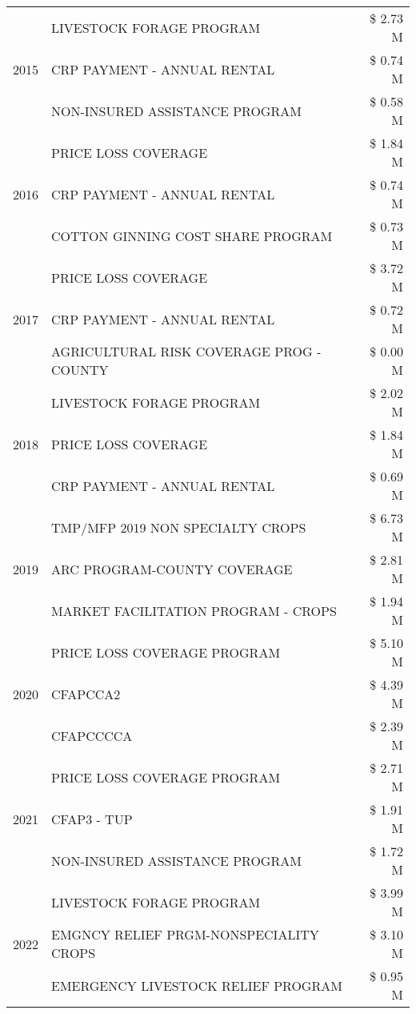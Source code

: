\begin{tabular}{llr}
\cline{1-3}
\multirow[t]{3}{*}{2015} & LIVESTOCK FORAGE PROGRAM & \$ 2.73 M \\
 & CRP PAYMENT - ANNUAL RENTAL & \$ 0.74 M \\
 & NON-INSURED ASSISTANCE PROGRAM & \$ 0.58 M \\
\cline{1-3}
\multirow[t]{3}{*}{2016} & PRICE LOSS COVERAGE & \$ 1.84 M \\
 & CRP PAYMENT - ANNUAL RENTAL & \$ 0.74 M \\
 & COTTON GINNING COST SHARE PROGRAM & \$ 0.73 M \\
\cline{1-3}
\multirow[t]{3}{*}{2017} & PRICE LOSS COVERAGE & \$ 3.72 M \\
 & CRP PAYMENT - ANNUAL RENTAL & \$ 0.72 M \\
 & AGRICULTURAL RISK COVERAGE PROG - COUNTY & \$ 0.00 M \\
\cline{1-3}
\multirow[t]{3}{*}{2018} & LIVESTOCK FORAGE PROGRAM & \$ 2.02 M \\
 & PRICE LOSS COVERAGE & \$ 1.84 M \\
 & CRP PAYMENT - ANNUAL RENTAL & \$ 0.69 M \\
\cline{1-3}
\multirow[t]{3}{*}{2019} & TMP/MFP 2019 NON SPECIALTY CROPS & \$ 6.73 M \\
 & ARC PROGRAM-COUNTY COVERAGE & \$ 2.81 M \\
 & MARKET FACILITATION PROGRAM - CROPS & \$ 1.94 M \\
\cline{1-3}
\multirow[t]{3}{*}{2020} & PRICE LOSS COVERAGE PROGRAM & \$ 5.10 M \\
 & CFAPCCA2 & \$ 4.39 M \\
 & CFAPCCCCA & \$ 2.39 M \\
\cline{1-3}
\multirow[t]{3}{*}{2021} & PRICE LOSS COVERAGE PROGRAM & \$ 2.71 M \\
 & CFAP3 - TUP & \$ 1.91 M \\
 & NON-INSURED ASSISTANCE PROGRAM & \$ 1.72 M \\
\cline{1-3}
\multirow[t]{3}{*}{2022} & LIVESTOCK FORAGE PROGRAM & \$ 3.99 M \\
 & EMGNCY RELIEF PRGM-NONSPECIALITY CROPS & \$ 3.10 M \\
 & EMERGENCY LIVESTOCK RELIEF PROGRAM & \$ 0.95 M \\
\cline{1-3}
\bottomrule
\end{tabular}
